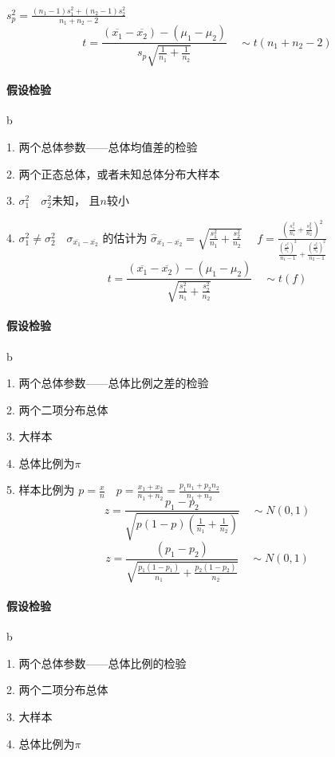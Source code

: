 \documentclass[UTF8,10pt]{book}
\begin{document}
{    $s_p^2 = \frac{(n_1-1)s_1^2 + (n_2-1)s_2^2}{n_1+n_2-2}$ $$ t = \frac{(\overline{x_1} - \overline{x_2} )- (\mu_1-\mu_2)}{s_p \sqrt{\frac{1}{n_1}+\frac{1}{n_2}}} \quad \sim t(n_1+n_2-2)$$
    
    \paragraph{假设检验} b
    
    1. 两个总体参数——总体均值差的检验 
    
    2. 两个正态总体，或者未知总体分布大样本 
    
    3. $\sigma_1^2 \quad \sigma_2^2$未知，    且$n$较小 
    
    4. $\sigma_1^2 \neq \sigma_2^2 \quad \sigma_{\overline{x_1} - \overline{x_2}} $
    的估计为 $ \hat{\sigma}_{\overline{x_1} - \overline{x_2}} =\sqrt{\frac{s_1^2}{n_1}+\frac{s_2^2}{n_2}} \quad$ 
    $f = \frac{(\frac{s_1^2}{n_1}+\frac{s_2^2}{n_2})^2}{\frac{(\frac{s_1^2}{n_1})^2}{n_1-1} + \frac{(\frac{s_2^2}{n_2})^2}{n_2-1}}$ 
    $$t = \frac{( \overline{x_1} - \overline{x_2} )- (\mu_1-\mu_2)}{\sqrt{\frac{s_1^2}{n_1}+\frac{s_2^2}{n_2}}} \quad \sim t(f)$$
    
    \paragraph{假设检验} b
    
    1. 两个总体参数——总体比例之差的检验 
    
    2. 两个二项分布总体 
    
    3. 大样本 
    
    4. 总体比例为$\pi$ 
    
    5. 样本比例为
    $p = \frac{x}{n} \quad p = \frac{x_1 +x_2}{n_1 + n_2}=\frac{p_1 n_1+p_2 n_2}{n_1 + n_2}$ 
    $$ z = \frac{p_1 - p_2}{\sqrt{p(1-p)(\frac{1}{n_1}+\frac{1}{n_2})}} \quad \sim N(0,1)$$ $$ z = \frac{(p_1-p_2)}{\sqrt{\frac{p_1(1-p_1)}{n_1} + \frac{p_2(1-p_2)}{n_2} }} \quad \sim N(0,1)$$
    
    \paragraph{假设检验} b
    
    1. 两个总体参数——总体比例的检验 
    
    2. 两个二项分布总体 
    
    3. 大样本 
    
    4. 总体比例为$\pi$ 
    
}
\end{document}
